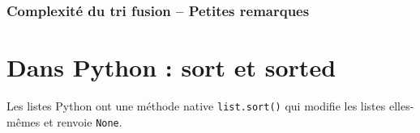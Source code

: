\subsubsection{Complexité du tri fusion -- Petites remarques}
%
%


\subsubsection{}


\section{Dans Python : sort et sorted}
Les listes Python ont une méthode native \texttt{list.sort()} qui modifie les listes elles-mêmes et renvoie \texttt{None}.
%
%
%
%
%
%
%
%		
%
%
%

